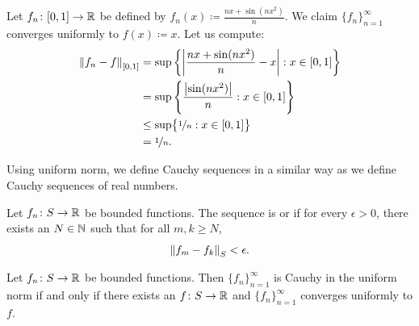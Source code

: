 \begin{example}
Let $f_n \colon [0,1] \to {\mathbb{R}}$ be defined by $f_n(x) \coloneqq \frac{nx+ \sin(nx^2)}{n}$.
We claim $\{ f_n \}_{n=1}^\infty$ converges uniformly to $f(x) \coloneqq x$.  Let us compute:
\begin{equation*}
\begin{split}
\left\lVert {f_n-f} \right\rVert_{[0,1]}
& =
\sup \left\{ \left\lvert {\frac{nx+ \sin(nx^2)}{n} - x} \right\rvert : x \in [0,1] \right\}
\\
& =
\sup \left\{ \frac{\left\lvert {\sin(nx^2)} \right\rvert}{n} : x \in [0,1] \right\}
\\
& \leq
\sup \bigl\{ \nicefrac{1}{n} : x \in [0,1] \bigr\}
\\
& = \nicefrac{1}{n}.
\end{split}
\end{equation*}
\end{example}

Using uniform norm, we define Cauchy sequences in a similar way
as we define Cauchy sequences of real numbers.

\begin{defn}
Let $f_n \colon S \to {\mathbb{R}}$ be bounded functions.
The sequence is \emph{}
or \emph{}
if for every $\epsilon > 0$, there exists an $N \in {\mathbb{N}}$ such
that for all $m,k \geq N$,
\begin{equation*}
\left\lVert {f_m-f_k} \right\rVert_S < \epsilon .
\end{equation*}
\end{defn}

\begin{prop} \label{prop:uniformcauchy}
Let $f_n \colon S \to {\mathbb{R}}$ be bounded functions.
Then $\{ f_n \}_{n=1}^\infty$ is Cauchy in the uniform norm if and only if
there exists an $f \colon S \to {\mathbb{R}}$ and $\{ f_n \}_{n=1}^\infty$ converges
uniformly to $f$.
\end{prop}

